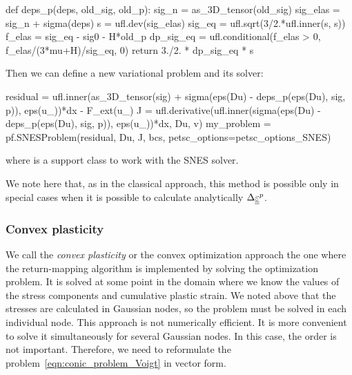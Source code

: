 \documentclass[12pt]{article}
\begin{document}
\begin{pythoncode}
    def deps_p(deps, old_sig, old_p):
        sig_n = as_3D_tensor(old_sig)
        sig_elas = sig_n + sigma(deps)
        s = ufl.dev(sig_elas)
        sig_eq = ufl.sqrt(3/2.*ufl.inner(s, s))
        f_elas = sig_eq - sig0 - H*old_p
        dp_sig_eq = ufl.conditional(f_elas > 0, f_elas/(3*mu+H)/sig_eq, 0) 
        return 3./2. * dp_sig_eq * s 
\end{pythoncode}
Then we can define a new variational problem and its solver:
\begin{pythoncode}
    residual = ufl.inner(as_3D_tensor(sig) + sigma(eps(Du) - deps_p(eps(Du), sig, p)), eps(u_))*dx - F_ext(u_)
    J = ufl.derivative(ufl.inner(sigma(eps(Du) - deps_p(eps(Du), sig, p)), eps(u_))*dx, Du, v)
    my_problem = pf.SNESProblem(residual, Du, J, bcs, petsc_options=petsc_options_SNES)
\end{pythoncode}
where  is a support class to work with the SNES solver.

We note here that, as in the classical approach, this method is possible only in special cases when it is possible to calculate analytically $\Delta\underline{\underline{\varepsilon}}^p$.

\subsubsection{Convex plasticity}
\label{sec:development:convex_plasticity}

We call the \textit{convex plasticity} or the convex optimization approach the one where the return-mapping algorithm is implemented by solving the optimization problem. It is solved at some point in the domain where we know the values of the stress components and cumulative plastic strain. We noted above that the stresses are calculated in Gaussian nodes, so the problem must be solved in each individual node. This approach is not numerically efficient. It is more convenient to solve it simultaneously for several Gaussian nodes. In this case, the order is not important. Therefore, we need to reformulate the problem~\eqref{eqn:conic_problem_Voigt} in vector form. 
\end{document}
